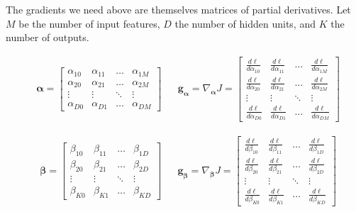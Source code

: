 \documentclass[11pt]{exam}
\numberwithin{equation}{section} %
\numberwithin{figure}{section} %
\numberwithin{table}{section} %
\newcommand{\adj}[1]{\frac{d \ell}{d #1}}
\newcommand{\gv}{\mathbf{g}}
\newcommand{\alphav     }{\boldsymbol \alpha     }
\newcommand{\betav      }{\boldsymbol \beta      }
\begin{document}
The gradients we need above are themselves matrices of partial derivatives. Let $M$ be the number of input features, $D$ the number of hidden units, and $K$ the number of outputs.

\begin{align}
    &\alphav =
    \begin{bmatrix}
        \alpha_{10} & \alpha_{11} & \dots  & \alpha_{1M} \\
        \alpha_{20} & \alpha_{21} & \dots  & \alpha_{2M} \\
        \vdots      & \vdots      & \ddots & \vdots \\
        \alpha_{D0} & \alpha_{D1} & \dots  & \alpha_{DM}
    \end{bmatrix}
    &&
    \gv_{\alphav} = \nabla_{\alphav} J = 
    \begin{bmatrix}
        \adj{\alpha_{10}} & \adj{\alpha_{11}} & \dots  & \adj{\alpha_{1M}} \\
        \adj{\alpha_{20}} & \adj{\alpha_{21}} & \dots  & \adj{\alpha_{2M}} \\
        \vdots      & \vdots      & \ddots & \vdots \\
        \adj{\alpha_{D0}} & \adj{\alpha_{D1}} & \dots  & \adj{\alpha_{DM}}
    \end{bmatrix}
\end{align}

\begin{align}
    &\betav =
    \begin{bmatrix}
        \beta_{10} & \beta_{11} & \dots  & \beta_{1D} \\
        \beta_{20} & \beta_{21} & \dots  & \beta_{2D} \\
        \vdots      & \vdots      & \ddots & \vdots \\
        \beta_{K0} & \beta_{K1} & \dots  & \beta_{KD}
    \end{bmatrix}
    &&
    \gv_{\betav} = \nabla_{\betav} J = 
    \begin{bmatrix}
        \adj{\beta_{10}} & \adj{\beta_{11}} & \dots  & \adj{\beta_{1D}} \\
        \adj{\beta_{20}} & \adj{\beta_{21}} & \dots  & \adj{\beta_{2D}} \\
        \vdots      & \vdots      & \ddots & \vdots \\
        \adj{\beta_{K0}} & \adj{\beta_{K1}} & \dots  & \adj{\beta_{KD}}
    \end{bmatrix}
\end{align}
\end{document}
